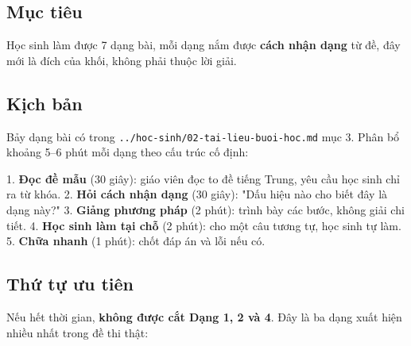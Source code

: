 \documentclass[11pt, a4paper]{article}
\begin{document}
\subsection{Mục tiêu}

Học sinh làm được 7 dạng bài, mỗi dạng nắm được \textbf{cách nhận dạng} từ đề, đây mới là đích của khối, không phải thuộc lời giải.

\subsection{Kịch bản}

Bảy dạng bài có trong \texttt{../hoc-sinh/02-tai-lieu-buoi-hoc.md} mục 3. Phân bổ khoảng 5–6 phút mỗi dạng theo cấu trúc cố định:

1. \textbf{Đọc đề mẫu} (30 giây): giáo viên đọc to đề tiếng Trung, yêu cầu học sinh chỉ ra từ khóa.
2. \textbf{Hỏi cách nhận dạng} (30 giây): "Dấu hiệu nào cho biết đây là dạng này?"
3. \textbf{Giảng phương pháp} (2 phút): trình bày các bước, không giải chi tiết.
4. \textbf{Học sinh làm tại chỗ} (2 phút): cho một câu tương tự, học sinh tự làm.
5. \textbf{Chữa nhanh} (1 phút): chốt đáp án và lỗi nếu có.

\subsection{Thứ tự ưu tiên}

Nếu hết thời gian, \textbf{không được cắt Dạng 1, 2 và 4}. Đây là ba dạng xuất hiện nhiều nhất trong đề thi thật:

\end{document}
